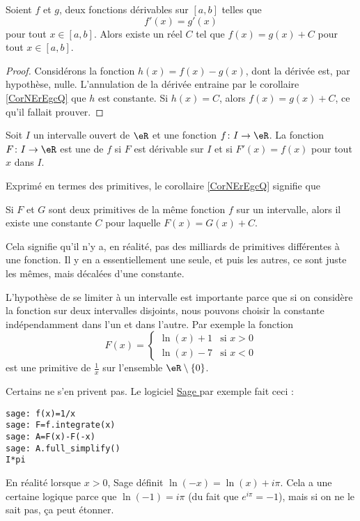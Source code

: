 \begin{corollary}   \label{CorNErEgcQ}
    Soient $f$ et $g$, deux fonctions dérivables sur $[a,b]$ telles que
    \begin{equation}
        f'(x) = g'(x)
    \end{equation}
    pour tout $x \in [a,b]$. Alors existe un réel $C$ tel que $f (x) = g (x) + C$ pour tout $x\in [a,b]$.
\end{corollary}

\begin{proof}
    Considérons la fonction $h(x)=f(x)-g(x)$, dont la dérivée est, par hypothèse, nulle. L'annulation de la dérivée entraine par le corollaire \ref{CorNErEgcQ} que $h$ est  constante. Si $h(x)=C$, alors $f(x)=g(x)+C$, ce qu'il fallait prouver.
\end{proof}

\begin{definition}  \label{DefXVMVooWhsfuI}
    Soit \( I\) un intervalle ouvert de \( \eR\) et une fonction \( f\colon I\to \eR\). La fonction \( F\colon I\to \eR\) est une  de \( f\) si \( F\) est dérivable sur \( I\) et si \( F'(x)=f(x)\) pour tout \( x\) dans \( I\).
\end{definition}

Exprimé en termes des primitives, le corollaire \ref{CorNErEgcQ} signifie que
\begin{corollary}  \label{CorZeroCst}
    Si $F$ et $G$ sont deux primitives de la même fonction $f$ sur un intervalle, alors il existe une constante $C$ pour laquelle $F(x)=G(x)+C$.
\end{corollary}
Cela signifie qu'il n'y a, en réalité, pas des milliards de primitives différentes à une fonction. Il y en a essentiellement une seule, et puis les autres, ce sont juste les mêmes, mais décalées d'une constante.

\begin{remark}
    L'hypothèse de se limiter à un intervalle est importante parce que si on considère la fonction sur deux intervalles disjoints, nous pouvons choisir la constante indépendamment dans l'un et dans l'autre. Par exemple la fonction
    \begin{equation}
        F(x)=\begin{cases}
            \ln(x)+1    &   \text{si } x>0\\
            \ln(x)-7    &    \text{si } x<0
        \end{cases}
    \end{equation}
    est une primitive de \( \frac{1}{ x }\) sur l'ensemble \( \eR\setminus\{ 0 \}\).

    Certains ne s'en privent pas. Le logiciel \href{ http://sagemath.org }{ Sage } par exemple fait ceci :
    \begin{verbatim}
sage: f(x)=1/x
sage: F=f.integrate(x)
sage: A=F(x)-F(-x)
sage: A.full_simplify()
I*pi
    \end{verbatim}
    En réalité lorsque \( x>0\), Sage définit \( \ln(-x)=\ln(x)+i\pi\). Cela a une certaine logique parce que \( \ln(-1)=i\pi\) (du fait que \(  e^{i\pi}=-1\)), mais si on ne le sait pas, ça peut étonner.
\end{remark}

